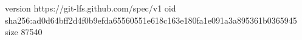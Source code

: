 version https://git-lfs.github.com/spec/v1
oid sha256:ad0d64bff2d4f0b9efda65560551e618c163e180fa1e091a3a895361b0365945
size 87540
